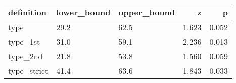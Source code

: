 
\begin{tabular}{lllrr}
\toprule
definition & lower\_bound & upper\_bound & z & p\\
\midrule
type & 29.2 & 62.5 & 1.623 & 0.052\\
type\_1st & 31.0 & 59.1 & 2.236 & 0.013\\
type\_2nd & 21.8 & 53.8 & 1.560 & 0.059\\
type\_strict & 41.4 & 63.6 & 1.843 & 0.033\\
\bottomrule
\end{tabular}

